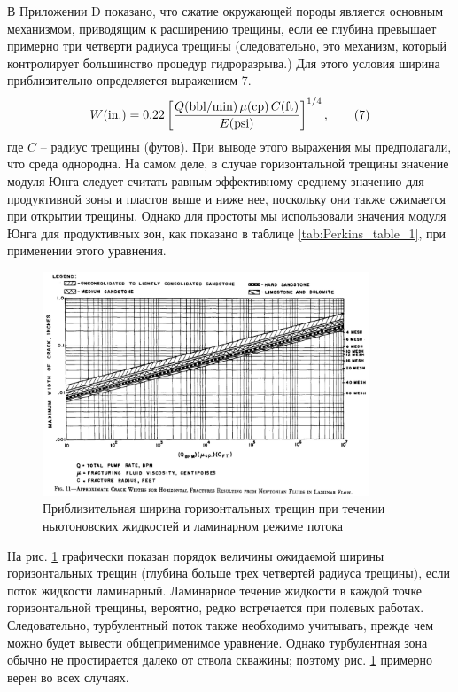 \documentclass[a4paper, 12pt]{article}
\newcommand{\beq}{\begin{equation}}
\newcommand{\eeq}{\end{equation}}
\begin{document}
В Приложении D показано, что сжатие окружающей породы является основным механизмом, приводящим к расширению трещины, если ее глубина превышает примерно три четверти радиуса трещины (следовательно, это механизм, который контролирует большинство процедур гидроразрыва.)
Для этого условия ширина приблизительно определяется выражением 7.
\beq\label{Perkins_7}
W(\text{in.})=0.22\left[\frac{Q(\text{bbl/min})\,\mu(\text{cp})\,C(\text{ft})}{E(\text{\text{psi}})}\right]^{1/4},
\tag{7}
\eeq
где $C$ -- радиус трещины (футов).\newline
При выводе этого выражения мы предполагали, что среда однородна.
На самом деле, в случае горизонтальной трещины значение модуля Юнга следует считать равным эффективному среднему значению для продуктивной зоны и пластов выше и ниже нее, поскольку они также сжимается при открытии трещины.
Однако для простоты мы использовали значения модуля Юнга для продуктивных зон, как показано в таблице \ref{tab:Perkins_table_1}, при применении этого уравнения.

\begin{figure}[H]
\center
\includegraphics[width=0.87\textwidth]{Perkins_11}
\caption{Приблизительная ширина горизонтальных трещин при течении ньютоновских жидкостей и ламинарном режиме потока}
\label{fig:Perkins11}
\end{figure}

На рис. \ref{fig:Perkins11} графически показан порядок величины ожидаемой ширины горизонтальных трещин (глубина больше трех четвертей радиуса трещины), если поток жидкости ламинарный.
Ламинарное течение жидкости в каждой точке горизонтальной трещины, вероятно, редко встречается при полевых работах.
Следовательно, турбулентный поток также необходимо учитывать, прежде чем можно будет вывести общеприменимое уравнение.
Однако турбулентная зона обычно не простирается далеко от ствола скважины; поэтому рис. \ref{fig:Perkins11} примерно верен во всех случаях.
\end{document}
